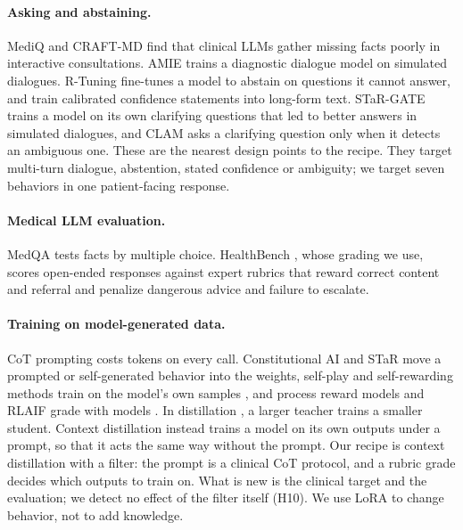 \documentclass{article}
\begin{document}
\paragraph{Asking and abstaining.} MediQ \citep{li2024mediq} and CRAFT-MD \citep{johri2025craftmd}
find that clinical LLMs gather missing facts poorly in interactive consultations. AMIE
\citep{tu2025amie} trains a diagnostic dialogue model on simulated dialogues. R-Tuning
\citep{zhang2024rtuning} fine-tunes a model to abstain on questions it cannot answer, and
\citet{band2024linguistic} train calibrated confidence statements into long-form text.
STaR-GATE \citep{andukuri2024stargate} trains a model on its own clarifying questions that led to
better answers in simulated dialogues, and CLAM \citep{kuhn2022clam} asks a clarifying question
only when it detects an ambiguous one. These are the nearest design points to the recipe. They
target multi-turn dialogue, abstention, stated confidence or ambiguity; we target seven behaviors
in one patient-facing response.

\paragraph{Medical LLM evaluation.} MedQA \citep{jin2021medqa} tests facts by multiple choice.
HealthBench \citep{healthbench2025}, whose grading we use, scores open-ended responses against expert
rubrics that reward correct content and referral and penalize dangerous advice and failure to escalate.

\paragraph{Training on model-generated data.} CoT prompting \citep{wei2022chain} costs tokens on
every call. Constitutional AI \citep{bai2022constitutional} and STaR \citep{zelikman2022star} move a
prompted or self-generated behavior into the weights, self-play and self-rewarding methods train
on the model's own samples \citep{chen2024selfplay, yuan2024selfrewarding, rafailov2023direct}, and
process reward models and RLAIF grade with models \citep{lightman2024lets, lee2024rlaif}. In distillation \citep{hinton2015distilling, ho2023large,
magister2023teaching}, a larger teacher trains a smaller student. Context distillation
\citep{askell2021general, snell2022learning} instead trains a model on its own outputs under a
prompt, so that it acts the same way without the prompt. Our recipe is context distillation with a
filter: the prompt is a clinical CoT protocol, and a rubric grade decides which outputs to train on.
What is new is the clinical target and the evaluation; we detect no effect of the filter itself
(H10). We use LoRA \citep{hu2022lora, dettmers2023qlora} to change behavior, not to add knowledge.
\end{document}
